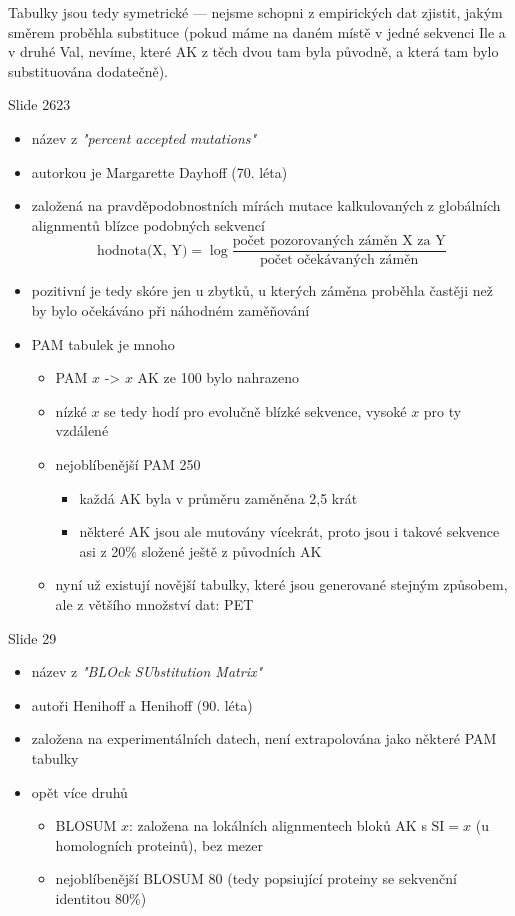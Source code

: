 \documentclass[DIV=8]{scrreprt}
\begin{document}
Tabulky jsou tedy symetrické --- nejsme schopni z empirických dat zjistit, jakým směrem proběhla substituce (pokud máme na daném místě v jedné sekvenci Ile a v druhé Val, nevíme, které AK z těch dvou tam byla původně, a která tam bylo substituována dodatečně).


Slide 2623
\begin{itemize}
    \item název z \emph{"percent accepted mutations"}
    \item autorkou je Margarette Dayhoff (70. léta)
    \item založená na pravděpodobnostních mírách mutace kalkulovaných z globálních alignmentů blízce podobných sekvencí
\[\text{hodnota(X, Y)} = \log \frac{\text{počet pozorovaných záměn X za Y}}{\text{počet očekávaných záměn}}\]
    \item pozitivní je tedy skóre jen u zbytků, u kterých záměna proběhla častěji než by bylo očekáváno při náhodném zaměňování
    \item PAM tabulek je mnoho
\begin{itemize}
    \item PAM \(x\) -> \(x\) AK ze 100 bylo nahrazeno
    \item nízké \(x\) se tedy hodí pro evolučně blízké sekvence, vysoké \(x\) pro ty vzdálené
    \item nejoblíbenější PAM 250
\begin{itemize}
    \item každá AK byla v průměru zaměněna 2,5 krát
    \item některé AK jsou ale mutovány vícekrát, proto jsou i takové sekvence asi z 20\% složené ještě z původních AK
\end{itemize}

    \item nyní už existují novější tabulky, které jsou generované stejným způsobem, ale z většího množství dat: PET
\end{itemize}

\end{itemize}


Slide 29
\begin{itemize}
    \item název z \emph{"BLOck SUbstitution Matrix"}
    \item autoři Henihoff a Henihoff (90. léta)
    \item založena na experimentálních datech, není extrapolována jako některé PAM tabulky
    \item opět více druhů
\begin{itemize}
    \item BLOSUM \(x\): založena na lokálních alignmentech bloků AK s \(\text{SI}=x\) (u homologních proteinů), bez mezer
    \item nejoblíbenější BLOSUM 80 (tedy popsiující proteiny se sekvenční identitou 80\%)
\end{itemize}

\end{itemize}
\end{document}
